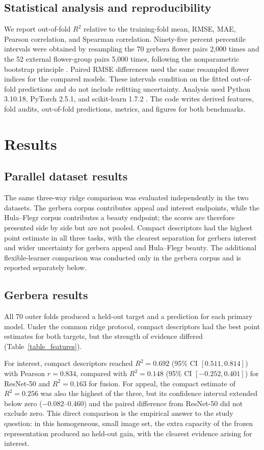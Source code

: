 \documentclass[10pt,letterpaper]{article}
\begin{document}
\subsection*{Statistical analysis and reproducibility}
We report out-of-fold $R^2$ relative to the training-fold mean, RMSE, MAE, Pearson correlation, and Spearman correlation. Ninety-five percent percentile intervals were obtained by resampling the 70 gerbera flower pairs 2,000 times and the 52 external flower-group pairs 5,000 times, following the nonparametric bootstrap principle \cite{efron1979}. Paired RMSE differences used the same resampled flower indices for the compared models. These intervals condition on the fitted out-of-fold predictions and do not include refitting uncertainty. Analysis used Python 3.10.18, PyTorch 2.5.1, and scikit-learn 1.7.2 \cite{paszke2019,pedregosa2011}. The code writes derived features, fold audits, out-of-fold predictions, metrics, and figures for both benchmarks.

\section*{Results}
\subsection*{Parallel dataset results}
The same three-way ridge comparison was evaluated independently in the two datasets. The gerbera corpus contributes appeal and interest endpoints, while the Hula--Flegr corpus contributes a beauty endpoint; the scores are therefore presented side by side but are not pooled. Compact descriptors had the highest point estimate in all three tasks, with the clearest separation for gerbera interest and wider uncertainty for gerbera appeal and Hula--Flegr beauty. The additional flexible-learner comparison was conducted only in the gerbera corpus and is reported separately below.

\subsection*{Gerbera results}
All 70 outer folds produced a held-out target and a prediction for each primary model. Under the common ridge protocol, compact descriptors had the best point estimates for both targets, but the strength of evidence differed (Table~\ref{table_features}).

For interest, compact descriptors reached $R^2 = 0.692$ (95\% CI $[0.511, 0.814]$) with Pearson $r = 0.834$, compared with $R^2 = 0.148$ (95\% CI $[-0.252, 0.401]$) for ResNet-50 and $R^2 = 0.163$ for fusion. For appeal, the compact estimate of $R^2 = 0.256$ was also the highest of the three, but its confidence interval extended below zero ($-0.082$--0.460) and the paired difference from ResNet-50 did not exclude zero.
 This direct comparison is the empirical answer to the study question: in this homogeneous, small image set, the extra capacity of the frozen representation produced no held-out gain, with the clearest evidence arising for interest.
\end{document}
